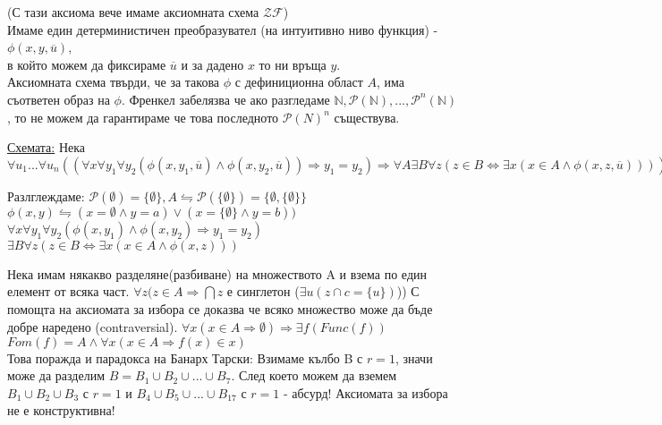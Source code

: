 \documentclass[fleqn, titlepage, 12pt]{report}
\begin{document}
 (С тази аксиома вече имаме аксиомната схема $ \mathcal{ZF} $) \\
Имаме един детерминистичен преобразувател (на интуитивно ниво функция) - $ \phi(x,y,\overline{u})$,\\
в който можем да фиксираме $\overline{u}$ и за дадено $ x $ то ни връща $ y $.\\
Аксиомната схема твърди, че за такова $\phi$ с дефиниционна област $ A $, има съответен образ на $\phi$.
Френкел забелязва че ако разгледаме $ \mathbb{N}, \mathcal{P}( \mathbb{N}), ..., \mathcal{P}^n( \mathbb{N})  $,
то не можем да гарантираме че това последното $ \mathcal{P}(N)^n $ съществува.
\bigbreak

\underline{Схемата:} Нека
$\forall{u_1}... \forall{u_n} ((\forall{x} \forall{y_1} \forall{y_2}  (\phi(x,y_1,\overline{u})\land \phi(
x,y_2,\overline{u}
))
\Rightarrow y_1 = y_2) \Rightarrow \forall{A} \exists{B} \forall{z} (z \in B \Leftrightarrow \exists{x} (
x \in A \land \phi(x,z,\overline{u})
)))$
\bigbreak

Разлглеждаме: $ \mathcal{P}(\emptyset) = \{ \emptyset\}, A \leftrightharpoons \mathcal{P}(
\{\emptyset\}
) = \{ \emptyset, \{ \emptyset\}\} $\\
$ \phi(x,y) \leftrightharpoons (x = \emptyset \land y = a) \lor (x = \{ \emptyset\} \land y = b) )$\\
$ \forall{x} \forall{y_1} \forall{y_2} ( \phi(x,y_1) \land \phi(x,y_2) \Rightarrow  y_1 = y_2)$\\
$ \exists{B} \forall{z} (z \in B \Leftrightarrow \exists{x} (x \in A \land \phi(x,z)))$\\
\bigbreak

 Нека имам някакво разделяне(разбиване) на множеството A
и взема по един елемент от всяка част.
$ \forall{z} (z \in A \Rightarrow  \bigcap z$ е синглетон ($ \exists{u} (z \cap c = \{ u\})$))
\bigbreak
С помощта на аксиомата за избора се доказва че всяко множество може да бъде добре наредено (contraversial).
$ \forall{x} (x \in A \Rightarrow \emptyset) \Rightarrow \exists{f} (Func(f))$\\
$ Fom(f) = A \land \forall{x} (x \in A \Rightarrow f(x) \in x)$\\
Това поражда и парадокса на Банарх Тарски: Взимаме кълбо B с $r = 1$,
значи може да разделим $B = B_1 \cup B_2 \cup ... \cup B_7$. След което можем да вземем
$B_1 \cup B_2 \cup B_3$ с $r = 1$ и $B_4 \cup B_5 \cup ... \cup B_17$ с $r = 1$ - абсурд!
Аксиомата за избора не е конструктивна!
\bigbreak
\end{document}
